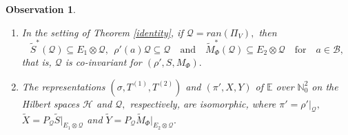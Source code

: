 \documentclass[12pt]{amsart}
\numberwithin{equation}{section}
\theoremstyle{plain}
\newtheorem{observation}[theorem]{Observation}
\newcommand{\ot}{\otimes}
\begin{document}
\begin{observation}
	\begin{enumerate}
		\item In the setting of Theorem \ref{identity}, if $\mathcal{Q}=ran(\Pi_V),$ then $$ \widetilde{S}^{*}(\mathcal{Q})\subseteq E_1\ot \mathcal{Q},~~ \rho'(a)\mathcal{Q}\subseteq \mathcal{Q}\quad \mbox{and}\quad \widetilde{M}_{\Phi}^*(\mathcal{Q})\subseteq E_2\ot \mathcal{Q} \quad \mbox{for}\quad a\in \mathcal{B},$$ that is, $\mathcal{Q}$ is co-invariant for $(\rho',S,M_{\Phi}).$
		\item The representations $(\sigma, T^{(1)}, T^{(2)})$ and $(\pi',X,Y)$ of $\mathbb{E}$ over $\mathbb{N}_0^2$ on the Hilbert spaces $\mathcal{H}$ and $\mathcal{Q},$ respectively, are isomorphic, where $\pi'=\rho'|_{\mathcal{Q}},$
		$\widetilde{X}= P_{\mathcal{Q}}\widetilde{S}|_{E_1\ot \mathcal{Q}}$ and $\widetilde{Y}= P_{\mathcal{Q}}\widetilde{M}_{\Phi}|_{E_2\ot \mathcal{Q}}.$
	\end{enumerate}
\end{observation}
\end{document}
